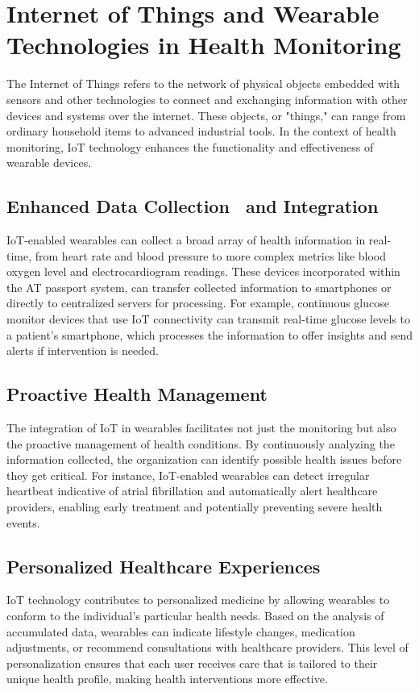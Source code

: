 \section{Internet of Things and Wearable Technologies in Health Monitoring}
The Internet of Things refers to the network of physical objects embedded with
sensors and other technologies to connect and exchanging information with other
devices and systems over the internet. These objects, or "things," can range
from ordinary household items to advanced industrial tools. In the context of
health monitoring, IoT technology enhances the functionality and effectiveness
of wearable devices.

\subsection{Enhanced Data Collection  and Integration}
IoT-enabled wearables can collect a broad array of health information in
real-time, from heart rate and blood pressure to more complex metrics like blood
oxygen level and electrocardiogram readings. These devices incorporated within
the AT passport system, can transfer collected information to smartphones or
directly to centralized servers for processing. For example, continuous glucose
monitor devices that use IoT connectivity can transmit real-time glucose levels
to a patient's smartphone, which processes the information to offer insights and
send alerts if intervention is needed.

\subsection{Proactive Health Management}
The integration of IoT in wearables facilitates not just the monitoring but also
the proactive management of health conditions.\cite{huhn2022impact} By
continuously analyzing the information collected, the organization can identify
possible health issues before they get critical. For instance, IoT-enabled
wearables can detect irregular heartbeat indicative of atrial fibrillation and
automatically alert healthcare providers, enabling early treatment and
potentially preventing severe health events.\cite{huhn2022impact}

\subsection{Personalized Healthcare Experiences}
IoT technology contributes to personalized medicine by allowing wearables to
conform to the individual's particular health needs. Based on the analysis of
accumulated data, wearables can indicate lifestyle changes, medication
adjustments, or recommend consultations with healthcare providers. This level of
personalization ensures that each user receives care that is tailored to their
unique health profile, making health interventions more effective.\cite{jin2019review}

